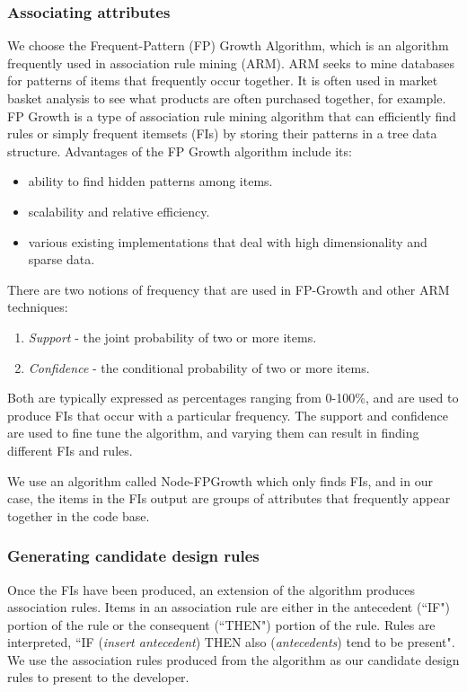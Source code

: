 \documentclass[12pt]{article}
\begin{document}
	
	
\subsubsection{Associating attributes}
	We choose the Frequent-Pattern (FP) Growth Algorithm, which is an algorithm frequently used in association rule mining (ARM). ARM seeks to mine databases for patterns of items that frequently occur together. It is often used in market basket analysis to see what products are often purchased together, for example. FP Growth is a type of association rule mining algorithm that can efficiently find rules or simply frequent itemsets (FIs) by storing their patterns in a tree data structure. Advantages of the FP Growth algorithm include its:
	\begin{itemize}
		\item ability to find hidden patterns among items.
		\item scalability and relative efficiency.
		\item various existing implementations that deal with high dimensionality and sparse data.
	\end{itemize}

There are two notions of frequency that are used in FP-Growth and other ARM techniques:
	\begin{enumerate}
		\item \textit{Support} - the joint probability of two or more items.
		\item \textit{Confidence} - the conditional probability of two or more items.
	\end{enumerate} 
Both are typically expressed as percentages ranging from 0-100\%, and are used to produce FIs that occur with a particular frequency. The support and confidence are used to fine tune the algorithm, and varying them can result in finding different FIs and rules.

We use an algorithm called Node-FPGrowth which only finds FIs, and in our case, the items in the FIs output are groups of attributes that frequently appear together in the code base.


\subsubsection{Generating candidate design rules}

Once the FIs have been produced, an extension of the algorithm produces association rules. Items in an association rule are either in the antecedent (``IF") portion of the rule or the consequent (``THEN") portion of the rule. Rules are interpreted, ``IF (\textit{insert antecedent}) THEN also (\textit{antecedents}) tend to be present". We use the association rules produced from the algorithm as our candidate design rules to present to the developer.
\end{document}
